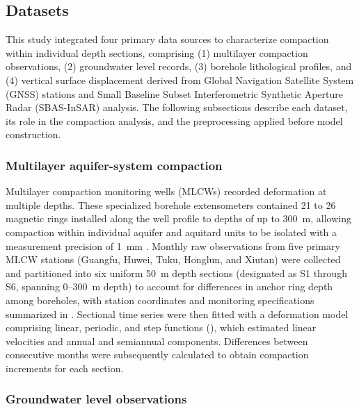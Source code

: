 
\subsection{Datasets}
\label{subsec:datasets}

This study integrated four primary data sources to characterize compaction within individual depth sections, comprising (1) multilayer compaction observations, (2) groundwater level records, (3) borehole lithological profiles, and (4) vertical surface displacement derived from Global Navigation Satellite System (GNSS) stations and Small Baseline Subset Interferometric Synthetic Aperture Radar (SBAS-InSAR) analysis. The following subsections describe each dataset, its role in the compaction analysis, and the preprocessing applied before model construction.

\subsubsection{Multilayer aquifer-system compaction}

Multilayer compaction monitoring wells (MLCWs) recorded deformation at multiple depths. These specialized borehole extensometers contained 21 to 26 magnetic rings installed along the well profile to depths of up to 300~m, allowing compaction within individual aquifer and aquitard units to be isolated with a measurement precision of 1~mm \citep{hung_measuring_2021}. Monthly raw observations from five primary MLCW stations (Guangfu, Huwei, Tuku, Honglun, and Xiutan) were collected and partitioned into six uniform 50~m depth sections (designated as S1 through S6, spanning 0--300~m depth) to account for differences in anchor ring depth among boreholes, with station coordinates and monitoring specifications summarized in . Sectional time series were then fitted with a deformation model comprising linear, periodic, and step functions (), which estimated linear velocities and annual and semiannual components. Differences between consecutive months were subsequently calculated to obtain compaction increments for each section.

\subsubsection{Groundwater level observations}

